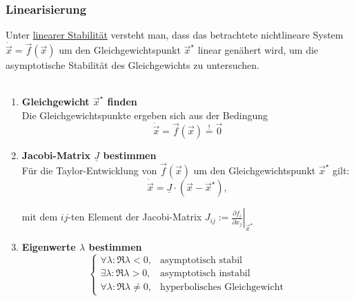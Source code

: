\documentclass{article}
\begin{document}
\subsubsection{Linearisierung}
Unter \underline{linearer Stabilität} versteht man, dass das betrachtete nichtlineare System $\dot{\vec{x}} = \vec{f}(\vec{x})$ um den Gleichgewichtspunkt $\vec{x}^\star$ linear genähert wird, um die asymptotische Stabilität des Gleichgewichts zu untersuchen.\\
\\
	\begin{enumerate}
		\item \textbf{Gleichgewicht $\vec{x}^\star$ finden}\\
		Die Gleichgewichtspunkte ergeben sich aus der Bedingung
			\begin{equation}
				\dot{\vec{x}} = \vec{f}(\vec{x}) \stackrel{!}{=} \vec{0}
			\end{equation}
	
	
		\item \textbf{Jacobi-Matrix $\underline{J}$ bestimmen}\\
		Für die Taylor-Entwicklung von $\vec{f}(\vec{x})$ um den Gleichgewichtspunkt $\vec{x}^\star$ gilt:
			\begin{equation}
				\dot{\vec{x}} = \underline{J} \cdot (\vec{x} - \vec{x}^\star),
			\end{equation}

		mit dem $ij$-ten Element der Jacobi-Matrix $J_{ij} := \left. \frac{\partial f_i}{\partial x_j} \right|_{\vec{x}^\star}$
	
	
		\item \textbf{Eigenwerte $\lambda$ bestimmen}
			\begin{equation}
				\begin{cases}
					\forall \lambda: \Re \lambda < 0, & \text{asymptotisch stabil} \\
					\exists\lambda: \Re \lambda > 0, & \text{asymptotisch instabil} \\
					\forall\lambda: \Re \lambda \neq 0, & \text{hyperbolisches Gleichgewicht}					
				\end{cases}
			\end{equation}
\end{enumerate}

\vspace{0.5cm}
\end{document}
